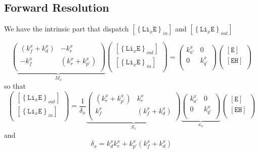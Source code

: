 \documentclass[aps,onecolumn,11pt]{revtex4}
\newcommand{\mychem}[1]{\mathtt{#1}}
\newcommand{\myconc}[1]{\left\lbrack{#1}\right\rbrack}
\newcommand{\LiEin}[1]{\myconc{\left\lbrace\mychem{Li}_{#1}\mychem{E}\right\rbrace_{in}}}
\newcommand{\LiEout}[1]{\myconc{\left\lbrace\mychem{Li}_{#1}\mychem{E}\right\rbrace_{out}}}
\newcommand{\EHin}{\myconc{\mychem{EH}}}
\newcommand{\Eout}{\myconc{\mychem{E}}}
\begin{document}
\subsection{Forward Resolution}
We have the intrinsic part that dispatch $\LiEin{x}$ and $\LiEout{x}$

\begin{equation}
\underbrace{
\begin{pmatrix}
	\left(k_f^x+k_d^x\right) & -k_r^x\\
	-k_f^x & \left(k_r^x+k_{p'}^x\right)\\
\end{pmatrix}
}_{M_x}
\begin{pmatrix}
	\LiEout{x}\\
	\LiEin{x}\\
\end{pmatrix}
=
	\begin{pmatrix}
	k_{a'}^x & 0 \\
	0     & k_{q'}^x \\
	\end{pmatrix}
	\begin{pmatrix}
	\Eout\\
	\EHin\\
	\end{pmatrix}
\end{equation}
so that
\begin{equation}
	\begin{pmatrix}
	\LiEout{x}\\
	\LiEin{x}\\
\end{pmatrix}
= \dfrac{1}{\delta_x} 
\underbrace{
\begin{pmatrix}
	\left(k_r^x+k_{p'}^x\right) & k_r^x\\
	k_f^x & \left(k_f^x+k_d^x\right)\\
\end{pmatrix}}_{S_x}
\underbrace{
\begin{pmatrix}
	k_{a'}^x & 0 \\
	0     & k_{q'}^x \\
	\end{pmatrix}
		}_{\kappa_x}
	\begin{pmatrix}
	\Eout\\
	\EHin\\
	\end{pmatrix}
\end{equation}
and
\begin{equation}
\delta_x = k_d^x k_r^x + k_{p'}^x\left(k_f^x+k_d^x\right) 
\end{equation}
\end{document}
